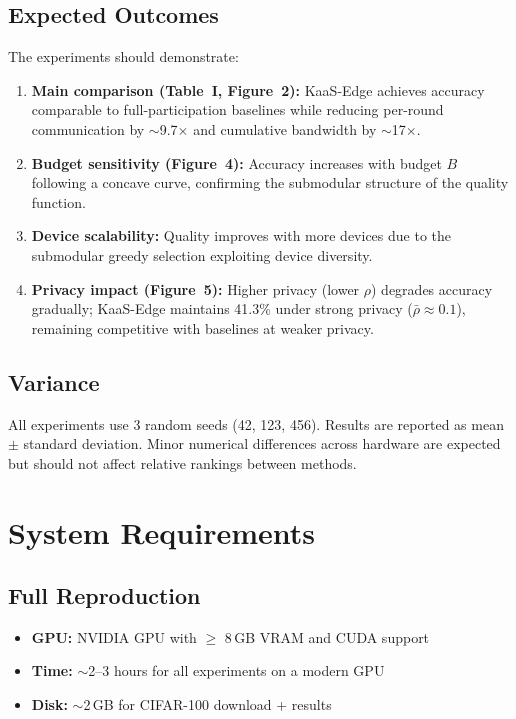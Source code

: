 \documentclass[conference]{IEEEtran}
\begin{document}
\subsection{Expected Outcomes}

The experiments should demonstrate:

\begin{enumerate}[noitemsep]
  \item \textbf{Main comparison (Table~I, Figure~2):} KaaS-Edge achieves accuracy comparable to full-participation baselines while reducing per-round communication by $\sim$9.7$\times$ and cumulative bandwidth by $\sim$17$\times$.
  \item \textbf{Budget sensitivity (Figure~4):} Accuracy increases with budget $B$ following a concave curve, confirming the submodular structure of the quality function.
  \item \textbf{Device scalability:} Quality improves with more devices due to the submodular greedy selection exploiting device diversity.
  \item \textbf{Privacy impact (Figure~5):} Higher privacy (lower $\rho$) degrades accuracy gradually; KaaS-Edge maintains 41.3\% under strong privacy ($\bar{\rho} \approx 0.1$), remaining competitive with baselines at weaker privacy.
\end{enumerate}

\subsection{Variance}

All experiments use 3 random seeds (42, 123, 456).
Results are reported as mean $\pm$ standard deviation.
Minor numerical differences across hardware are expected but should not affect relative rankings between methods.

\section{System Requirements}

\subsection{Full Reproduction}

\begin{itemize}[noitemsep]
  \item \textbf{GPU:} NVIDIA GPU with $\geq$ 8\,GB VRAM and CUDA support
  \item \textbf{Time:} $\sim$2--3 hours for all experiments on a modern GPU
  \item \textbf{Disk:} $\sim$2\,GB for CIFAR-100 download + results
\end{itemize}
\end{document}
